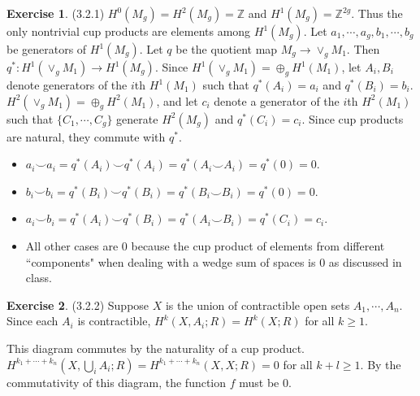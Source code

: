 \documentclass[12pt, psamsfonts]{amsart}
\theoremstyle{definition}
\newtheorem*{exer}{Exercise}
\theoremstyle{remark}
\numberwithin{equation}{section}
\begin{document}
\begin{exer}{(3.2.1)}
  $H^0(M_g) = H^2(M_g) = \mathbb{Z}$ and $H^1(M_g) = \mathbb{Z}^{2g}$.
  Thus the only nontrivial cup products are elements among $H^1(M_g)$.
  Let $a_1, \cdots, a_g, b_1, \cdots, b_g$ be generators of $H^1(M_g)$.
  Let $q$ be the quotient map $M_g \rightarrow \vee_g M_1$.
  Then $q^{\ast}: H^1(\vee_g M_1) \rightarrow H^1(M_g)$.
  Since $H^1(\vee_g M_1) = \oplus_g H^1(M_1)$, let $A_i, B_i$ denote generators of the $i$th $H^1(M_1)$ such that $q^{\ast}(A_i) = a_i$ and $q^{\ast}(B_i) = b_i$.
  $H^2(\vee_g M_1) = \oplus_g H^2(M_1)$, and let $c_i$ denote a generator of the $i$th $H^2(M_1)$ such that $\{ C_1, \cdots, C_g \}$ generate $H^2(M_g)$ and $q^{\ast}(C_i) = c_i$.
  Since cup products are natural, they commute with $q^{\ast}$.
  \begin{itemize}
    \item
      $a_i \smile a_i = q^{\ast}(A_i) \smile q^{\ast}(A_i) = q^{\ast}(A_i \smile A_i) = q^{\ast}(0) = 0$.
    \item
      $b_i \smile b_i = q^{\ast}(B_i) \smile q^{\ast}(B_i) = q^{\ast}(B_i \smile B_i) = q^{\ast}(0) = 0$.
    \item
      $a_i \smile b_i = q^{\ast}(A_i) \smile q^{\ast}(B_i) = q^{\ast}(A_i \smile B_i) = q^{\ast}(C_i) = c_i$.
    \item
      All other cases are 0 because the cup product of elements from different ``components" when dealing with a wedge sum of spaces is 0 as discussed in class.
  \end{itemize}
\end{exer}

\begin{exer}{(3.2.2)}
  Suppose $X$ is the union of contractible open sets $A_1, \cdots, A_n$.
  Since each $A_i$ is contractible, $H^k(X, A_i; R) = H^k(X; R)$ for all $k \geq 1$.

  \begin{center}
  \end{center}

  This diagram commutes by the naturality of a cup product.
  $H^{k_1 + \cdots + k_n}(X, \bigcup_i A_i; R) = H^{k_1 + \cdots + k_n}(X, X; R) = 0$ for all $k + l \ge 1$.
  By the commutativity of this diagram, the function $f$ must be 0.
\end{exer}
\end{document}

